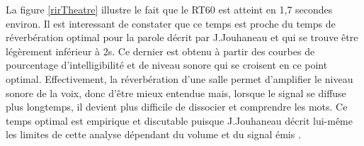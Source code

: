 La figure \ref{rirTheatre} illustre le fait que le \gls{RT60} est atteint en 1,7 secondes environ. Il est interessant de constater que ce temps est proche du temps de réverbération optimal pour la parole décrit par J.Jouhaneau \cite[p.209]{jouhaneau} et qui se trouve être légèrement inférieur à 2s. Ce dernier est obtenu à partir des courbes de pourcentage d'intelligibilité et de niveau sonore qui se croisent en ce point optimal. Effectivement, la réverbération d'une salle permet d'amplifier le niveau sonore de la voix, donc d'être mieux entendue mais, lorsque le signal se diffuse plus longtemps, il devient plus difficile de dissocier et comprendre les mots. Ce temps optimal est empirique et discutable puisque J.Jouhaneau décrit lui-même les limites de cette analyse dépendant du volume et du signal émis \cite[p.218]{jouhaneau}. 

